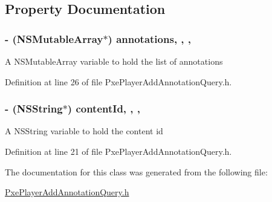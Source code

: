 \subsection{Property Documentation}
\hypertarget{interface_pxe_player_add_annotation_query_a93fc94c5081b1c0e5042c3a5cf13aa25}{
\subsubsection[{annotations}]{\setlength{\rightskip}{0pt plus 5cm}-\/ (N\-S\-Mutable\-Array$\ast$) annotations\hspace{0.3cm}{\ttfamily [read]}, {\ttfamily [write]}, {\ttfamily [nonatomic]}, {\ttfamily [strong]}}}\label{interface_pxe_player_add_annotation_query_a93fc94c5081b1c0e5042c3a5cf13aa25}
A N\-S\-Mutable\-Array variable to hold the list of annotations 

Definition at line 26 of file Pxe\-Player\-Add\-Annotation\-Query.\-h.

\hypertarget{interface_pxe_player_add_annotation_query_ac20c893521cbf285367245b250832e11}{
\subsubsection[{content\-Id}]{\setlength{\rightskip}{0pt plus 5cm}-\/ (N\-S\-String$\ast$) content\-Id\hspace{0.3cm}{\ttfamily [read]}, {\ttfamily [write]}, {\ttfamily [nonatomic]}, {\ttfamily [strong]}}}\label{interface_pxe_player_add_annotation_query_ac20c893521cbf285367245b250832e11}
A N\-S\-String variable to hold the content id 

Definition at line 21 of file Pxe\-Player\-Add\-Annotation\-Query.\-h.



The documentation for this class was generated from the following file\-:\begin{DoxyCompactItemize}
\item 
\hyperlink{_pxe_player_add_annotation_query_8h}{Pxe\-Player\-Add\-Annotation\-Query.\-h}\end{DoxyCompactItemize}
